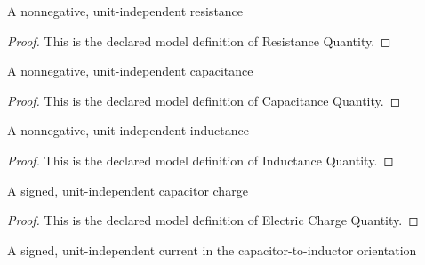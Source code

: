 \begin{definition}
  \label{def:physics:phyx-mini-0934:phyxminiproblems-problemphyxmini0934-resistancequantity}
  A nonnegative, unit-independent resistance
\end{definition}
\begin{proof}
  This is the declared model definition of Resistance Quantity.
\end{proof}
\begin{definition}
  \label{def:physics:phyx-mini-0934:phyxminiproblems-problemphyxmini0934-capacitancequantity}
  A nonnegative, unit-independent capacitance
\end{definition}
\begin{proof}
  This is the declared model definition of Capacitance Quantity.
\end{proof}
\begin{definition}
  \label{def:physics:phyx-mini-0934:phyxminiproblems-problemphyxmini0934-inductancequantity}
  A nonnegative, unit-independent inductance
\end{definition}
\begin{proof}
  This is the declared model definition of Inductance Quantity.
\end{proof}
\begin{definition}
  \label{def:physics:phyx-mini-0934:phyxminiproblems-problemphyxmini0934-electricchargequantity}
  A signed, unit-independent capacitor charge
\end{definition}
\begin{proof}
  This is the declared model definition of Electric Charge Quantity.
\end{proof}
\begin{definition}
  \label{def:physics:phyx-mini-0934:phyxminiproblems-problemphyxmini0934-electriccurrentquantity}
  A signed, unit-independent current in the capacitor-to-inductor orientation
\end{definition}

